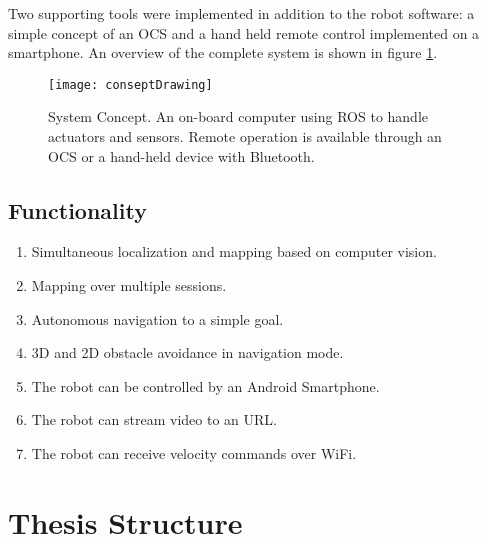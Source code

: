 Two supporting tools were implemented in addition to the robot software: a simple concept of an \ac{OCS} and a hand held remote control implemented on a smartphone. An overview of the complete system is shown in figure \ref{fig:conseptDrawing}.

\begin{figure}[h]
	\centering
	\texttt{[image: conseptDrawing]}
	\caption{System Concept. An on-board computer using \ac{ROS} to handle actuators and sensors. Remote operation is available through an \ac{OCS} or a hand-held device with Bluetooth.}
	\label{fig:conseptDrawing}
\end{figure}

\subsection{Functionality}

\begin{enumerate}
\item Simultaneous localization and mapping based on computer vision.
\item Mapping over multiple sessions.
\item Autonomous navigation to a simple goal.
\item 3D and 2D obstacle avoidance in navigation mode.
\item The robot can be controlled by an Android Smartphone.
\item The robot can stream video to an URL.
\item The robot can receive velocity commands over WiFi.
\end{enumerate} 

\section{Thesis Structure}